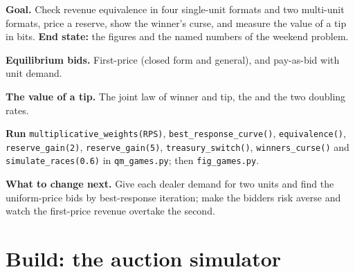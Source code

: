 \begin{tutorial}
\textbf{Goal.} Check revenue equivalence in four single-unit formats and two multi-unit formats, price a reserve, show the winner's curse, and measure the value of a tip in bits. \textbf{End state:} the
figures and the named numbers of the weekend problem.
\begin{tutsteps}
\item \textbf{Equilibrium bids.} First-price (closed form and general), and pay-as-bid with unit demand.
\item \textbf{The value of a tip.} The joint law of winner and tip, the  and the two doubling rates.
\item \textbf{Run} \texttt{multiplicative\_weights(RPS)}, \texttt{best\_response\_curve()}, \texttt{equivalence()}, \texttt{reserve\_gain(2)}, \texttt{reserve\_gain(5)}, \texttt{treasury\_switch()},
\texttt{winners\_curse()} and \texttt{simulate\_races(0.6)} in \texttt{qm\_games.py}; then \texttt{fig\_games.py}.
\end{tutsteps}
\textbf{What to change next.} Give each dealer demand for two units and find the uniform-price bids by best-response iteration; make the bidders risk averse and watch the first-price revenue overtake the second.
\end{tutorial}

\section{Build: the auction simulator}\label{bld:qm:games-auctions-and-information:bidding}

